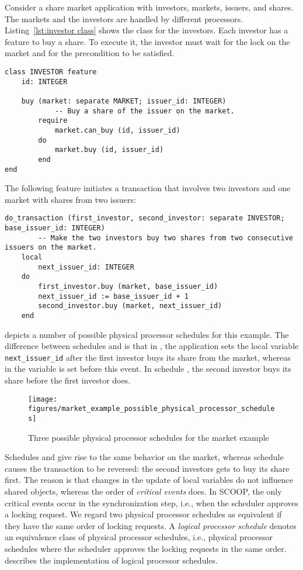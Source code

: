 Consider a share market application with investors, markets, issuers, and shares. The markets and the investors are handled by different processors. Listing~\ref{lst:investor class} shows the class for the investors. Each investor has a feature to buy a share. To execute it, the investor must wait for the lock on the market and for the precondition to be satisfied.
\begin{lstlisting}[caption=Investor class, label=lst:investor class, language=SCOOP]
class INVESTOR feature
	id: INTEGER
	
	buy (market: separate MARKET; issuer_id: INTEGER)
			-- Buy a share of the issuer on the market.
		require
			market.can_buy (id, issuer_id)
		do
			market.buy (id, issuer_id)
		end
end
\end{lstlisting}
The following feature initiates a transaction that involves two investors and one market with shares from two issuers:
\begin{lstlisting}[language=SCOOP]
do_transaction (first_investor, second_investor: separate INVESTOR; base_issuer_id: INTEGER)
		-- Make the two investors buy two shares from two consecutive issuers on the market.
	local
		next_issuer_id: INTEGER	
	do
		first_investor.buy (market, base_issuer_id)
		next_issuer_id := base_issuer_id + 1
		second_investor.buy (market, next_issuer_id)
	end
\end{lstlisting}

 depicts a number of possible physical processor schedules for this example. The difference between schedules  and  is that in , the application sets the local variable \lstinline[language=SCOOP]!next_issuer_id! after the first investor buys its share from the market, whereas in  the variable is set before this event. In schedule , the second investor buys its share before the first investor does.
\begin{figure}[ht]
  \centering
  \texttt{[image: figures/market\_example\_possible\_physical\_processor\_schedules]}
  \caption{Three possible physical processor schedules for the market example}
  \label{fig:market example possible physical processor schedules}
\end{figure}
Schedules  and  give rise to the same behavior on the market, whereas schedule  causes the transaction to be reversed: the second investors gets to buy its share first. The reason is that changes in the update of local variables do not influence shared objects, whereas the order of \emph{critical events} does. In SCOOP, the only critical events occur in the synchronization step, i.e., when the scheduler approves a locking request. We regard two physical processor schedules as equivalent if they have the same order of locking requests. A \emph{logical processor schedule} denotes an equivalence class of physical processor schedules, i.e., physical processor schedules where the scheduler approves the locking requests in the same order.  describes the implementation of logical processor schedules.


